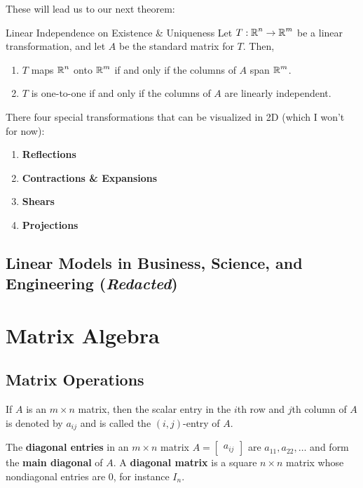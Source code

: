 \documentclass{article}
\begin{document}
These will lead us to our next theorem:

\begin{theorem}{Linear Independence on Existence \& Uniqueness}
	Let $T: \operatorname{\mathbb{R}}^n \to \operatorname{\mathbb{R}}^m$ be a linear transformation, and let $A$ be the standard matrix for $T$. Then,

	\begin{enumerate}[label=\alph*)]
		\item
		      $T$ maps $\operatorname{\mathbb{R}}^n$ onto $\operatorname{\mathbb{R}}^m$ if and only if the columns of $A$ span $\operatorname{\mathbb{R}}^m$.
		\item
		      $T$ is one-to-one if and only if the columns of $A$ are linearly independent.
	\end{enumerate}
\end{theorem}

There four special transformations that can be visualized in 2D (which I won't for now):

\begin{enumerate}[label=\alph*)]
	\item
	      \textbf{Reflections}
	\item
	      \textbf{Contractions \& Expansions}
	\item
	      \textbf{Shears}
	\item
	      \textbf{Projections}
\end{enumerate}

\subsection{Linear Models in Business, Science, and Engineering (\emph{Redacted})}

\section{Matrix Algebra}

\subsection{Matrix Operations}
If $A$ is an $m \times n$ matrix, then the scalar entry in the $i$th row and $j$th column of $A$ is denoted by $a_{ij}$ and is called the $(i, j)$-entry of $A$.

The \textbf{diagonal entries} in an $m \times n$ matrix $A =  \begin{bmatrix} a_{ij} \end{bmatrix}$ are $a_{11}, a_{22}, \ldots$ and form the \textbf{main diagonal} of $A$. A \textbf{diagonal matrix} is a square $n \times n$ matrix whose nondiagonal entries are $0$, for instance $I_n$.
\end{document}
